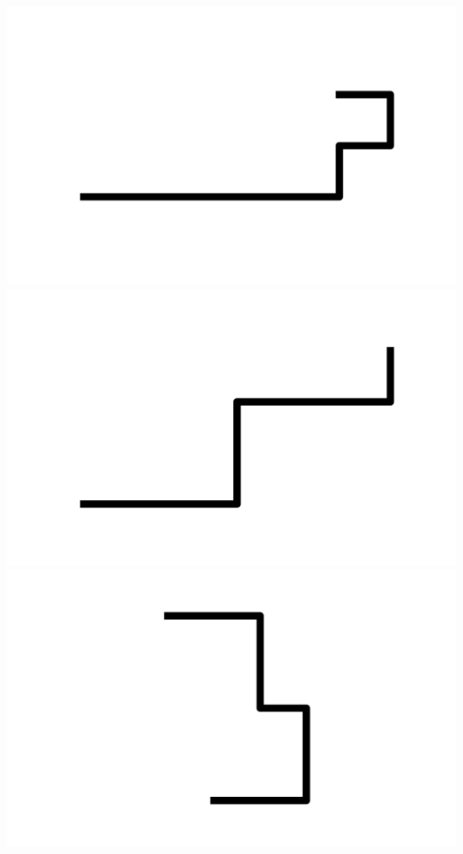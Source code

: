 \documentclass[]{report}
\begin{document}
\includegraphics[scale=.1]{pictures/21/state_cluster_shapes_49.pdf} 
\includegraphics[scale=.1]{pictures/21/state_cluster_shapes_50.pdf} 
\includegraphics[scale=.1]{pictures/21/state_cluster_shapes_51.pdf} 
\end{document}
